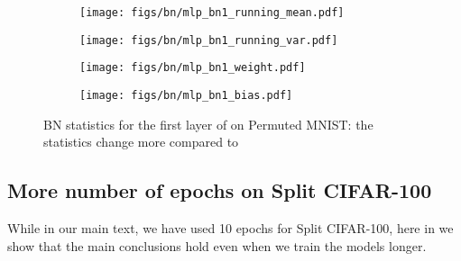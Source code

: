 \begin{figure*}[h]
\centering
\begin{subfigure}{.45\textwidth}
      \centering
      \texttt{[image: figs/bn/mlp\_bn1\_running\_mean.pdf]}
      \caption{}
      \label{fig:mlp-bn1-running-mean}
\end{subfigure}\hfill
\begin{subfigure}{.45\textwidth}
      \centering
      \texttt{[image: figs/bn/mlp\_bn1\_running\_var.pdf]}
      \caption{}
      \label{fig:mlp-bn1-running-var}
\end{subfigure}\hfill
\begin{subfigure}{.45\textwidth}
      \centering
      \texttt{[image: figs/bn/mlp\_bn1\_weight.pdf]}
      \caption{}
      \label{fig:mlp-bn1-weights}
\end{subfigure}\hfill
\begin{subfigure}{.45\textwidth}
      \centering
      \texttt{[image: figs/bn/mlp\_bn1\_bias.pdf]}
      \caption{}
      \label{fig:mlp-bn1-bias}
\end{subfigure}
\caption{BN statistics for the first layer of  on Permuted MNIST: the statistics change more compared to~}
\label{fig:mlp-bn1}
\end{figure*}

\begin{table}[h!]
\centering
\caption{Permuted MNIST: The MLP with BN has slightly higher learning accuracy, but significantly higher forgetting as well.}
\label{tab:perm-mnist-bn}
\end{table}




\subsection{More number of epochs on Split CIFAR-100}
While in our main text, we have used 10 epochs for Split CIFAR-100, here in  we show that the main conclusions hold even when we train the models longer.

